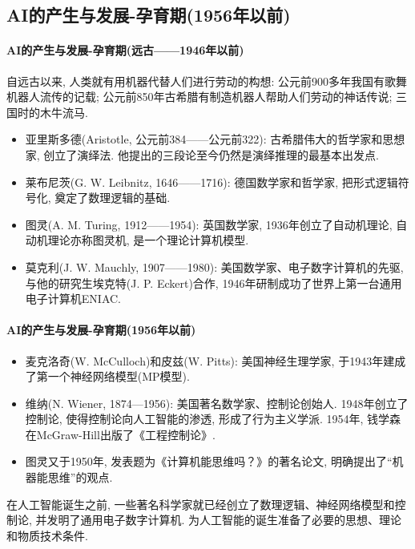 \subsection{AI的产生与发展-孕育期(1956年以前)}
\paragraph{AI的产生与发展-孕育期(远古——1946年以前)}

自远古以来, 人类就有用机器代替人们进行劳动的构想: 公元前900多年我国有歌舞机器人流传的记载; 公元前850年古希腊有制造机器人帮助人们劳动的神话传说; 三国时的木牛流马.
\begin{itemize}
\item  亚里斯多德(Aristotle, 公元前384——公元前322): 古希腊伟大的哲学家和思想家, 创立了演绎法. 他提出的三段论至今仍然是演绎推理的最基本出发点.
\item  莱布尼茨(G. W. Leibnitz, 1646——1716): 德国数学家和哲学家, 把形式逻辑符号化, 奠定了数理逻辑的基础.
\item  图灵(A. M. Turing, 1912——1954): 英国数学家, 1936年创立了自动机理论, 自动机理论亦称图灵机, 是一个理论计算机模型.
\item  莫克利(J. W. Mauchly, 1907——1980): 美国数学家、电子数字计算机的先驱, 与他的研究生埃克特(J. P. Eckert)合作, 1946年研制成功了世界上第一台通用电子计算机ENIAC.
\end{itemize}
\paragraph{AI的产生与发展-孕育期(1956年以前)}
\begin{itemize}
\item  麦克洛奇(W. McCulloch)和皮兹(W. Pitts): 美国神经生理学家, 于1943年建成了第一个神经网络模型(MP模型).
\item  维纳(N. Wiener, 1874—1956): 美国著名数学家、控制论创始人. 1948年创立了控制论, 使得控制论向人工智能的渗透, 形成了行为主义学派. 1954年, 钱学森在McGraw-Hill出版了《工程控制论》.
\item  图灵又于1950年, 发表题为《计算机能思维吗？》的著名论文, 明确提出了“机器能思维”的观点.
\end{itemize}
\begin{remark}
在人工智能诞生之前, 一些著名科学家就已经创立了数理逻辑、神经网络模型和控制论, 并发明了通用电子数字计算机. 为人工智能的诞生准备了必要的思想、理论和物质技术条件.
\end{remark}
